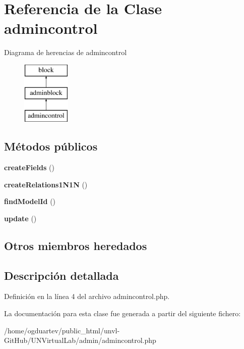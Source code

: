 \hypertarget{classadmincontrol}{}\section{Referencia de la Clase admincontrol}
\label{classadmincontrol}
Diagrama de herencias de admincontrol\begin{figure}[H]
\begin{center}
\leavevmode
\includegraphics[height=3.000000cm]{classadmincontrol}
\end{center}
\end{figure}
\subsection*{Métodos públicos}
\begin{DoxyCompactItemize}
\item 
\mbox{\label{classadmincontrol_a105d0b8037931db4a31acb5eb35db838}} 
{\bfseries create\+Fields} ()
\item 
\mbox{\label{classadmincontrol_a678192be99fa0eddbe86d999e9d573f2}} 
{\bfseries create\+Relations1\+N1N} ()
\item 
\mbox{\label{classadmincontrol_a375df9422444a3312a77931d41e7c565}} 
{\bfseries find\+Model\+Id} ()
\item 
\mbox{\label{classadmincontrol_a8996c04e21d903aca9ad406b6d274aba}} 
{\bfseries update} ()
\end{DoxyCompactItemize}
\subsection*{Otros miembros heredados}


\subsection{Descripción detallada}


Definición en la línea 4 del archivo admincontrol.\+php.



La documentación para esta clase fue generada a partir del siguiente fichero\+:\begin{DoxyCompactItemize}
\item 
/home/ogduartev/public\+\_\+html/unvl-\/\+Git\+Hub/\+U\+N\+Virtual\+Lab/admin/admincontrol.\+php\end{DoxyCompactItemize}
